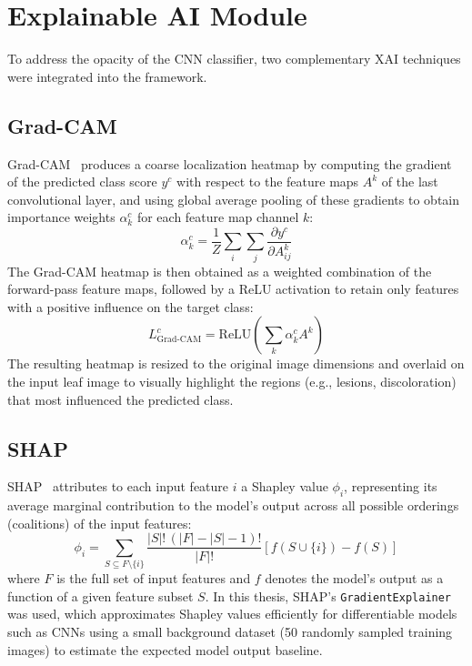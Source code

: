 \documentclass[12pt,a4paper,oneside]{report}
\begin{document}
\section{Explainable AI Module}
\label{sec:xai}
To address the opacity of the CNN classifier, two complementary XAI techniques were integrated into the
framework.

\subsection{Grad-CAM}
Grad-CAM~\cite{selvaraju2017gradcam} produces a coarse localization heatmap by computing the gradient of the
predicted class score $y^c$ with respect to the feature maps $A^k$ of the last convolutional layer, and using
global average pooling of these gradients to obtain importance weights $\alpha_k^c$ for each feature map channel
$k$:
\begin{equation}
\alpha_k^c = \frac{1}{Z} \sum_{i}\sum_{j} \frac{\partial y^c}{\partial A^k_{ij}}
\end{equation}
The Grad-CAM heatmap is then obtained as a weighted combination of the forward-pass feature maps, followed by a
ReLU activation to retain only features with a positive influence on the target class:
\begin{equation}
L^c_{\text{Grad-CAM}} = \text{ReLU}\left(\sum_k \alpha_k^c A^k\right)
\end{equation}
The resulting heatmap is resized to the original image dimensions and overlaid on the input leaf image to
visually highlight the regions (e.g., lesions, discoloration) that most influenced the predicted class.

\subsection{SHAP}
SHAP~\cite{lundberg2017shap} attributes to each input feature $i$ a Shapley value $\phi_i$, representing its
average marginal contribution to the model's output across all possible orderings (coalitions) of the input
features:
\begin{equation}
\phi_i = \sum_{S \subseteq F \setminus \{i\}} \frac{|S|!\,(|F|-|S|-1)!}{|F|!} \left[f(S \cup \{i\}) - f(S)\right]
\end{equation}
where $F$ is the full set of input features and $f$ denotes the model's output as a function of a given feature
subset $S$. In this thesis, SHAP's \texttt{GradientExplainer} was used, which approximates Shapley values
efficiently for differentiable models such as CNNs using a small background dataset (50 randomly sampled training
images) to estimate the expected model output baseline.
\end{document}
